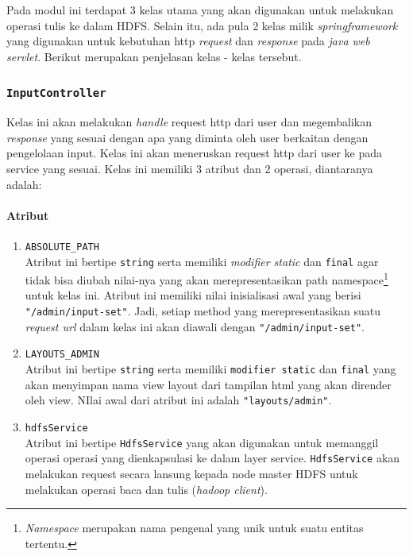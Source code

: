 Pada modul ini terdapat 3 kelas utama yang akan digunakan untuk melakukan operasi tulis ke dalam HDFS. Selain itu, ada pula 2 kelas milik \textit{springframework} yang digunakan untuk kebutuhan http \textit{request} dan \textit{response} pada \textit{java web servlet}. Berikut merupakan penjelasan kelas - kelas tersebut.
\subsubsection{\texttt{InputController}}
	Kelas ini akan melakukan \textit{handle} request http dari user dan megembalikan \textit{response} yang sesuai dengan apa yang diminta oleh user berkaitan dengan pengelolaan input. Kelas ini akan meneruskan request http dari user ke pada service yang sesuai. Kelas ini memiliki 3 atribut dan 2 operasi, diantaranya adalah:
	
	\paragraph{Atribut}
		\begin{enumerate}
			\item \verb|ABSOLUTE_PATH|\\
			Atribut ini bertipe \texttt{string} serta memiliki \textit{modifier static} dan \texttt{final} agar tidak bisa diubah nilai-nya yang akan merepresentasikan path namespace\footnote{\textit{Namespace} merupakan nama pengenal yang unik untuk suatu entitas tertentu.} untuk kelas ini. Atribut ini memiliki nilai inisialisasi awal yang berisi \texttt{"/admin/input-set"}. Jadi, setiap method yang merepresentasikan suatu \textit{request url} dalam kelas ini akan diawali dengan \texttt{"/admin/input-set"}.

			\item \verb|LAYOUTS_ADMIN|\\
			Atribut ini bertipe \texttt{string} serta memiliki \texttt{modifier static} dan \texttt{final} yang akan menyimpan nama view layout dari tampilan html yang akan dirender oleh view. NIlai awal dari atribut ini adalah \texttt{"layouts/admin"}.

			\item \texttt{hdfsService}\\
			Atribut ini bertipe \texttt{HdfsService} yang akan digunakan untuk memanggil operasi operasi yang dienkapsulasi ke dalam layer service. \texttt{HdfsService} akan melakukan request secara lansung kepada node master HDFS untuk melakukan operasi baca dan tulis (\textit{hadoop client}).

		\end{enumerate}
					
